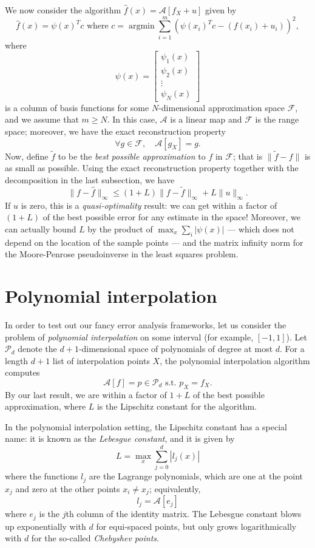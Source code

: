 \documentclass[12pt, leqno]{article} %
\begin{document}
We now consider the algorithm
$\hat{f}(x) = \mathcal{A}[f_X + u]$ given by
\[
  \hat{f}(x) = \psi(x)^T c \mbox{ where }
  c = \operatorname{argmin} \sum_{i=1}^m (\psi(x_i)^T c - (f(x_i)+u_i))^2,
\]
where
\[
  \psi(x) =
  \begin{bmatrix} \psi_1(x) \\ \psi_2(x) \\ \vdots \\ \psi_N(x) \end{bmatrix} 
\]
is a column of basis functions for some $N$-dimensional approximation
space $\mathcal{F}$, and we assume that $m \geq N$.  In this case,
$\mathcal{A}$ is a linear map and $\mathcal{F}$ is the range space;
moreover, we have the exact reconstruction property
\[
  \forall g \in \mathcal{F}, \quad \mathcal{A}[g_X] = g.
\]
Now, define $\tilde{f}$ to be the {\em best possible approximation} to
$f$ in $\mathcal{F}$; that is $\|\tilde{f}-f\|$ is as small as
possible.  Using the exact reconstruction property together with
the decomposition in the last subsection, we have
\[
  \|f-\hat{f}\|_\infty \leq (1+L) \|f-\tilde{f}\|_\infty + L\|u\|_\infty.
\]
If $u$ is zero, this is a {\em quasi-optimality} result: we can get
within a factor of $(1+L)$ of the best possible error for any estimate
in the space!  Moreover, we can actually bound $L$ by the product of
$\max_x \sum_i |\psi(x)|$ --- which does not depend on the location of
the sample points --- and the matrix infinity norm for the
Moore-Penrose pseudoinverse in the least squares problem.

\section{Polynomial interpolation}

In order to test out our fancy error analysis frameworks, let us
consider the problem of {\em polynomial interpolation} on some
interval (for example, $[-1,1]$).  Let $\mathcal{P}_d$ denote the
$d+1$-dimensional space of polynomials of degree at most $d$.  For a
length $d+1$ list of interpolation points $X$, the polynomial
interpolation algorithm computes
\[
  \mathcal{A}[f] = p \in \mathcal{P}_d \mbox{ s.t.~}
  p_X = f_X.
\]
By our last result, we are within a factor of $1+L$ of the best
possible approximation, where $L$ is the Lipschitz constant for
the algorithm.

In the polynomial interpolation setting, the Lipschitz constant has a
special name: it is known as the {\em Lebesgue constant}, and it is
given by
\[
  L = \max_x \sum_{j=0}^d |l_j(x)|
\]
where the functions $l_j$ are the Lagrange polynomials, which are one
at the point $x_j$ and zero at the other points $x_i \neq x_j$; equivalently,
\[
  l_j = \mathcal{A}[e_j]
\]
where $e_j$ is the $j$th column of the identity matrix.  The Lebesgue
constant blows up exponentially with $d$ for equi-spaced points, but
only grows logarithmically with $d$ for the so-called {\em Chebyshev points}.
\end{document}

